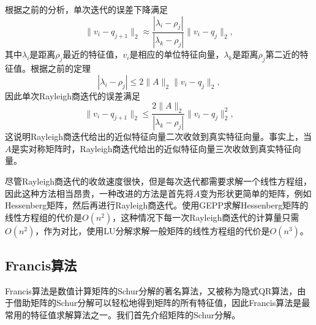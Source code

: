 \documentclass[a4paper,10pt]{ctexart}
\begin{document}
根据之前的分析，单次迭代的误差下降满足
\[
    \| v_i - q_{j+1} \|_2 \approx \frac{|\lambda_i - \rho_j|}{|\lambda_k-\rho_j|} \| v_i - q_j \|_2,
\]
其中$ \lambda_i $是距离$ \rho_j $最近的特征值，$ v_i $是相应的单位特征向量，$ \lambda_k $是距离$ \rho_j $第二近的特征值。根据之前的定理
\[
    |\lambda_i - \rho_j| \leqslant 2\| A \|_2 \| v_i - q_j \|_2,
\]
因此单次Rayleigh商迭代的误差满足
\begin{equation}
    \| v_i - q_{j+1} \|_2 \leqslant \frac{2\| A \|_2}{|\lambda_k-\rho_j|} \| v_i - q_j \|_2^2,
\end{equation}
这说明Rayleigh商迭代给出的近似特征向量二次收敛到真实特征向量。事实上，当$ A $是实对称矩阵时，Rayleigh商迭代给出的近似特征向量三次收敛到真实特征向量。

尽管Rayleigh商迭代的收敛速度很快，但是每次迭代都需要求解一个线性方程组，因此这种方法相当昂贵，一种改进的方法是首先将$ A $变为形状更简单的矩阵，例如Hessenberg矩阵，然后再进行Rayleigh商迭代。使用GEPP求解Hessenberg矩阵的线性方程组的代价是$ O(n^2) $，这种情况下每一次Rayleigh商迭代的计算量只需$ O(n^2) $，作为对比，使用LU分解求解一般矩阵的线性方程组的代价是$ O(n^3) $。


\subsection{Francis算法}
Francis算法是数值计算矩阵的Schur分解的著名算法，又被称为隐式QR算法，由于借助矩阵的Schur分解可以轻松地得到矩阵的所有特征值，因此Francis算法是最常用的特征值求解算法之一。我们首先介绍矩阵的Schur分解。
\end{document}
